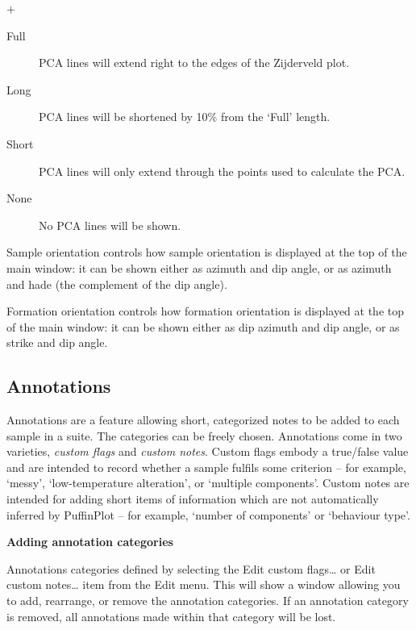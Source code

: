 \documentclass[a4paper,british]{article}
\newcommand{\menuitemlabel}[1]{%
\mbox{\textsf{#1}}\hfil}
\newenvironment{menuitemlist}%
{\begin{list}{}{%
\renewcommand{\makelabel}{\menuitemlabel}%
\setlength{\labelwidth}{35pt}%
\setlength{\leftmargin}%
             {\labelwidth+\labelsep}}}%
{\end{list}}
\newcommand{\ppcmd}[1]{\textsf{#1}} %
\newcommand{\caps}[1]{\MakeTextUppercase{#1}} %
\newcommand{\quot}[1]{`#1'}
\newcommand{\mypara}[1]{\noindent\textbf{#1}

\noindent\ignorespaces} %
\begin{document}
\begin{menuitemlist}
\begin{description}
\item[Full] \caps{pca} lines will extend right to the edges of the Zijderveld
  plot.
\item[Long] \caps{pca} lines will be shortened by 10\% from the `Full' length.
\item[Short] \caps{pca} lines will only extend through the points used to calculate
  the \caps{pca}.
\item[None] No \caps{pca} lines will be shown.
\end{description}

\item[Sample orientation] controls how sample orientation is displayed at the
  top of the main window: it can be shown either as azimuth and dip angle, or
  as azimuth and hade (the complement of the dip angle).

\item[Formation orientation] controls how formation orientation is displayed
  at the top of the main window: it can be shown either as dip azimuth and
  dip angle, or as strike and dip angle.

\end{menuitemlist}

\subsection{\label{sec:annotations}Annotations}

Annotations are a feature allowing short, categorized notes to be added to
each sample in a suite. The categories can be freely chosen. Annotations come
in two varieties, \emph{custom flags} and \emph{custom notes}. Custom flags
embody a true/false value and are intended to record whether a sample fulfils
some criterion -- for example, \quot{messy}, \quot{low-temperature
  alteration}, or \quot{multiple components}. Custom notes are intended for
adding short items of information which are not automatically inferred by
PuffinPlot -- for example, \quot{number of components} or \quot{behaviour
  type}.

\mypara{Adding annotation categories}Annotations categories defined by
selecting the \ppcmd{Edit custom flags\ldots} or \ppcmd{Edit custom
  notes\ldots} item from the \ppcmd{Edit} menu. This will show a window
allowing you to add, rearrange, or remove the annotation categories. If
an annotation category is removed, all annotations made within that
category will be lost.
\end{document}
